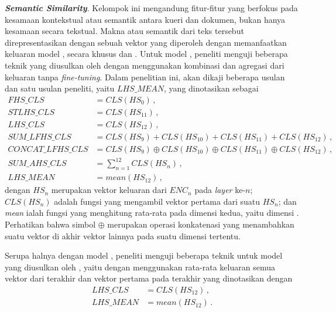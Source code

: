 \vspace{2mm}
\noindent{}\textbf{\textit{Semantic Similarity}}. Kelompok ini mengandung fitur-fitur yang berfokus pada kesamaan kontekstual atau semantik antara kueri dan dokumen, bukan hanya kesamaan secara tekstual. Makna atau semantik dari teks tersebut direpresentasikan dengan sebuah vektor yang diperoleh dengan memanfaatkan keluaran model \neural{} \network{}, secara khusus \tfive{} dan \bert{}. Untuk model \bert{}, peneliti menguji beberapa teknik yang diusulkan oleh \citet{devlin2018bert} dengan menggunakan kombinasi dan agregasi dari keluaran  \bert{} tanpa \textit{fine-tuning}. Dalam penelitian ini, akan dikaji beberapa usulan \citeauthor{devlin2018bert} dan satu usulan peneliti, yaitu  $LHS\_MEAN$, yang dinotasikan sebagai
\begin{align*}
    FHS\_CLS&=CLS(HS_{0}) \, , \\
    STLHS\_CLS&=CLS(HS_{11}) \, , \\
    LHS\_CLS&=CLS(HS_{12}) \, , \\
    SUM\_LFHS\_CLS&=CLS(HS_{9}) + CLS(HS_{10}) + CLS(HS_{11}) + CLS(HS_{12}) \, , \\
    CONCAT\_LFHS\_CLS&=CLS(HS_{9}) \oplus{} CLS(HS_{10}) \oplus{} CLS(HS_{11}) \oplus{} CLS(HS_{12}) \, , \\
    SUM\_AHS\_CLS&=\sum^{12}_{n=1} CLS(HS_{n}) \, , \\
    LHS\_MEAN&=mean(HS_{12}) \, ,
\end{align*}
dengan $HS_{n}$ merupakan vektor keluaran dari $ENC_{n}$ pada \textit{layer} ke-$n$; $CLS(HS_{n})$ adalah fungsi yang mengambil vektor \token{} pertama dari suatu \hs{} $HS_{n}$; dan \textit{mean} ialah fungsi yang menghitung rata-rata pada dimensi kedua, yaitu dimensi \token{}. Perhatikan bahwa simbol $\oplus{}$ merupakan operasi konkatenasi yang menambahkan suatu vektor di akhir vektor lainnya pada suatu dimensi tertentu.

Serupa halnya dengan model \bert{}, peneliti menguji beberapa teknik untuk model \tfive{} yang diusulkan oleh \citet{ni2021sentence}, yaitu dengan menggunakan rata-rata keluaran semua vektor \token{} dari \hs{} terakhir dan vektor \token{} pertama pada \hs{} terakhir yang dinotasikan dengan
\begin{align*}
    LHS\_CLS&=CLS(HS_{12}) \, ,\\
    LHS\_MEAN&=mean(HS_{12}) \, .
\end{align*}

